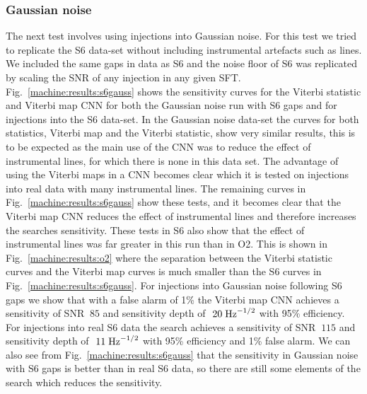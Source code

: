 \subsubsection{Gaussian noise}

The next test involves using injections into Gaussian noise. For this test we tried to replicate the S6 data-set without including instrumental artefacts such as lines. We included the same gaps in data as S6 and the noise floor of S6 was replicated by scaling the \ac{SNR} of any injection in any given \ac{SFT}. 
Fig.~\ref{machine:results:s6gauss} shows the sensitivity curves for the Viterbi statistic and Viterbi map \ac{CNN} for both the Gaussian noise run with S6 gaps and for injections into the S6 data-set. 
In the Gaussian noise data-set the curves for both statistics, Viterbi map and the Viterbi statistic, show very similar results, this is to be expected as the main use of the \ac{CNN} was to reduce the effect of instrumental lines, for which there is none in this data set. 
The advantage of using the Viterbi maps in a \ac{CNN} becomes clear which it is tested on injections into real data with many instrumental lines. 
The remaining curves in Fig.~\ref{machine:results:s6gauss} show these tests, and it becomes clear that the Viterbi map \ac{CNN} reduces the effect of instrumental lines and therefore increases the searches sensitivity. 
These tests in S6 also show that the effect of instrumental lines was far greater in this run than in O2. 
This is shown in Fig.~\ref{machine:results:o2} where the separation between the Viterbi statistic curves and the Viterbi map curves is much smaller than the S6 curves in Fig.~\ref{machine:results:s6gauss}.
For injections into Gaussian noise following S6 gaps we show that with a false alarm of 1\% the Viterbi map \ac{CNN} achieves a sensitivity of SNR $~85$ and sensitivity depth of $~20\; {\rm Hz}^{-1/2}$ with 95\% efficiency. For injections into real S6 data the search achieves a sensitivity of SNR $~115$ and sensitivity depth of $~11\; {\rm Hz}^{-1/2}$ with 95\% efficiency and 1\% false alarm. We can also see from Fig.~\ref{machine:results:s6gauss} that the sensitivity in Gaussian noise with S6 gaps is better than in real S6 data, so there are still some elements of the search which reduces the sensitivity.

